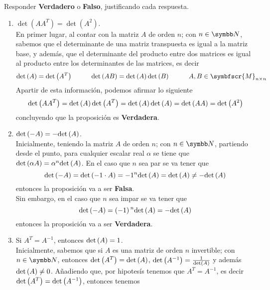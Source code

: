 \item Responder \textbf{Verdadero} o \textbf{Falso}, justificando cada respuesta.
    \begin{enumerate}[label=\listAlph]
        \item \(\det\left(AA^T\right) = \det\left(A^2\right)\). \\
            En primer lugar, al contar con la matriz \(A\) de orden \(n\); con \(n \in \realN\),
            sabemos que el determinante de una matriz transpuesta es igual a la matriz base, y además,
            que el determinante del producto entre dos matrices es igual al producto entre los determinantes de las matrices, es decir 
            \[
                \pdet{A} = \pdet{A^T}
                \hspace{1cm}
                \pdet{AB} = \pdet{A}\pdet{B} \hspace{1cm} A,B \in \symbfscr{M}_{n \times n}
            \]
            Apartir de esta información, podemos afirmar lo siguiente
            \[
                \text{det} \left( AA^{T} \right) = \text{det} \left( A \right)\text{det} \left( A^T \right) = \text{det} \left( A \right)\text{det} \left( A \right) = \text{det} \left( AA \right) = \text{det} \left( A^2 \right)
            \]
            concluyendo que la proposición es \textbf{Verdadera}.
        \item \(\text{det} \left( -A \right) = -\text{det} \left( A \right)\). \\
            Inicialmente, teniendo la matriz \(A\) de orden \(n\); con \(n \in \realN\),
            partiendo desde el punto, para cualquier escalar real \(\alpha\) se tiene que \(\text{det} \left( \alpha A \right) = \alpha^n \text{det} \left( A \right)\).
            En el caso que \(n\) sea par se va tener que
            \[
                \text{det} \left( -A \right) = \text{det} \left( -1 \cdot A \right) = -1^{n} \text{det} \left( A \right) = \text{det} \left( A \right) \neq -\text{det} \left( A \right)
            \]
            entonces la proposición va a ser \textbf{Falsa}.
            \\[0.25cm]
            Sin embargo, en el caso que \(n\) sea impar se va tener que
            \[
                \text{det} \left( -A \right) = \left(-1\right){}^{n} \text{det} \left( A \right) = -\text{det} \left( A \right)
            \]
            entonces la proposición va a ser \textbf{Verdadera}.
        \item Si \(A^T = A^{-1}\), entonces \(\text{det} \left( A \right) = 1\). \\
            Inicialmente, sabemos que si \(A\) es una matriz de orden \(n\) invertible; con \(n \in \realN\), 
            entonces \(\text{det} \left( A^T \right) = \text{det} \left( A \right)\), \(\text{det} \left( A^{-1} \right) = \frac{1}{\text{det} \left( A \right)}\) y además \(\text{det} \left( A \right) \neq 0\). 
            Añadiendo que, por hipotesís tenemos que \(A^T = A^{-1}\), es decir \(\text{det} \left( A^T \right) = \text{det} \left( A^{-1} \right)\), entonces tenemos

\end{enumerate}
